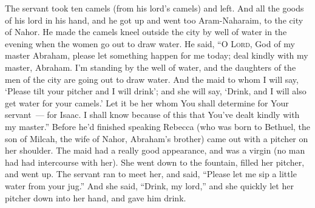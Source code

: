 \begin{inparaenum}
     The servant took ten camels (from his lord's camels) and left. And all the goods of his lord in his hand, and he got up and went too Aram-Naharaim, to the city of Nahor.%
     He made the camels kneel outside the city by well of water in the evening when the women go out to draw water.%
     He said, ``O \textsc{Lord}, God of my master Abraham, please let something happen for me today; deal kindly with my master, Abraham.%
     I'm standing by the well of water, and the daughters of the men of the city are going out to draw water.%
     And the maid to whom I will say, `Please tilt your pitcher and I will drink'; and she will say, `Drink, and I will also get water for your camels.' Let it be her whom You shall determine for Your servant~--- for Isaac. I shall know because of this that You've dealt kindly with my master.''%
     Before he'd finished speaking Rebecca (who was born to Bethuel, the son of Milcah, the wife of Nahor, Abraham's brother) came out with a pitcher on her shoulder.%
     The maid had a really good appearance, and was a virgin (no man had had intercourse with her). She went down to the fountain, filled her pitcher, and went up.%
     The servant ran to meet her, and said, ``Please let me sip a little water from your jug.''%
     And she said, ``Drink, my lord,'' and she quickly let her pitcher down into her hand, and gave him drink.%

\end{inparaenum}

